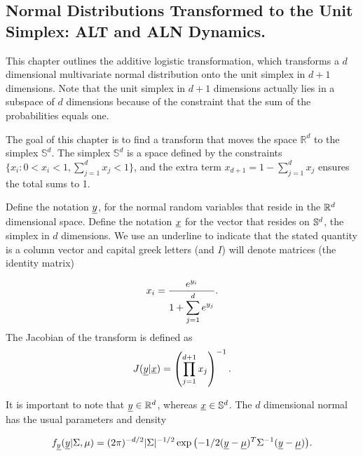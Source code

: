 
\subsection{Normal Distributions Transformed to the Unit Simplex: ALT and ALN Dynamics. }\label{sec:ALN_chapter}

This chapter outlines the additive logistic transformation, which transforms a $d$ dimensional multivariate normal distribution onto the unit simplex in $d+1$ dimensions. Note that the unit simplex in $d+1$ dimensions actually lies in a subspace of $d$ dimensions because of the constraint that the sum of the probabilities equals one. 

The goal of this chapter is to find a transform that moves the space $\mathbb{R}^d$  to the simplex $\mathbb{S}^d$.  The simplex $\mathbb{S}^d$ is a space defined by the constraints $\{x_i: 0<x_i<1, \sum_{j=1}^dx_j <1 \}$, and the extra term $x_{d+1}=1-\sum_{j=1}^d x_j$ ensures the total sums to 1.  

Define the notation $\underline{y}$, for the normal random variables that reside in the $\mathbb{R}^{d}$  dimensional space. Define the notation $\underline{x}$  for the vector that resides on $\mathbb{S}^{d}$, the simplex in $d$ dimensions. We use an underline to indicate that the stated quantity is a column vector and capital greek letters (and $I$) will denote matrices (the identity matrix) 

\begin{equation}\label{eqn:simplex_transform}
x_i = \frac{e^{y_i}}{1+\displaystyle{\sum_{j=1}^de^{y_j}}}. \\
\end{equation}
The Jacobian of the transform is defined as
\begin{equation}\label{eqn:jacobian}
J(\underline{y} \vert \underline{x}) = \left( \prod_{j=1}^{d+1}x_j \right)^{-1}.
\end{equation}

It is important to note that $\underline{y}\in\mathbb{R}^{d}$, whereas $\underline{x}\in\mathbb{S}^{d}$. The $d$ dimensional normal has the usual parameters and density

\begin{equation}\label{eqn:multinormal}
f_{\underline{y}}(\underline{y}\vert \Sigma, \mu)=(2\pi)^{-d/2}|\Sigma|^{-1/2}\exp{\left(-1/2(\underline{y}-\underline{\mu})^T\Sigma^{-1}(\underline{y}-\underline{\mu})\right)}.
\end{equation}

